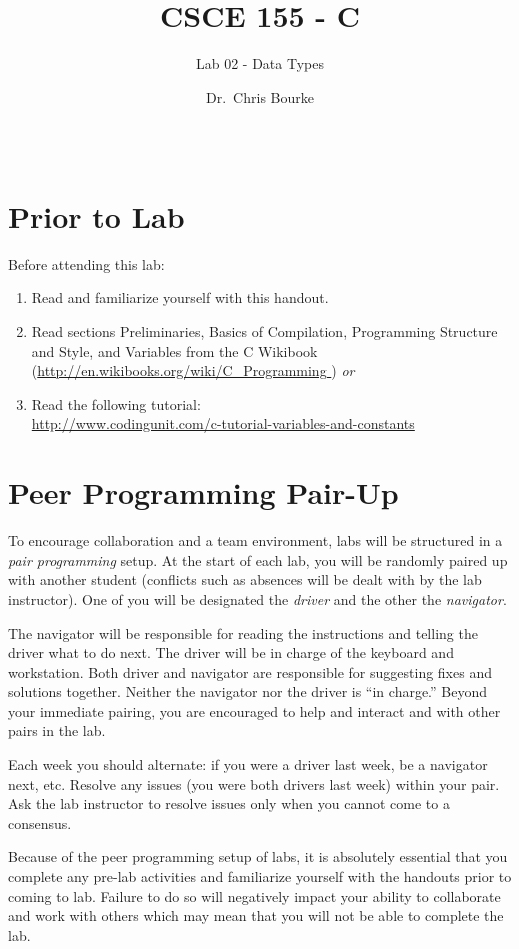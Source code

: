 \documentclass[12pt]{scrartcl}
\title{CSCE 155 - C}
\subtitle{Lab 02 - Data Types}
\author{Dr.\ Chris Bourke}
\date{~}
\begin{document}
\maketitle

\section*{Prior to Lab}

Before attending this lab:
\begin{enumerate}
  \item Read and familiarize yourself with this handout.
  \item Read sections Preliminaries, Basics of Compilation, 
  	Programming Structure and Style, and Variables from the C Wikibook
	(\url{http://en.wikibooks.org/wiki/C_Programming }) \emph{or}
  \item Read the following tutorial:\\ 
  	\url{http://www.codingunit.com/c-tutorial-variables-and-constants}
\end{enumerate}

\section*{Peer Programming Pair-Up}

To encourage collaboration and a team environment, labs will be
structured in a \emph{pair programming} setup.  At the start of
each lab, you will be randomly paired up with another student 
(conflicts such as absences will be dealt with by the lab instructor).
One of you will be designated the \emph{driver} and the other
the \emph{navigator}.  

The navigator will be responsible for reading the instructions and
telling the driver what to do next.  The driver will be in charge of the
keyboard and workstation.  Both driver and navigator are responsible
for suggesting fixes and solutions together.  Neither the navigator
nor the driver is ``in charge.''  Beyond your immediate pairing, you
are encouraged to help and interact and with other pairs in the lab.

Each week you should alternate: if you were a driver last week, 
be a navigator next, etc.  Resolve any issues (you were both drivers
last week) within your pair.  Ask the lab instructor to resolve issues
only when you cannot come to a consensus.  

Because of the peer programming setup of labs, it is absolutely 
essential that you complete any pre-lab activities and familiarize
yourself with the handouts prior to coming to lab.  Failure to do
so will negatively impact your ability to collaborate and work with 
others which may mean that you will not be able to complete the
lab.  
\end{document}

